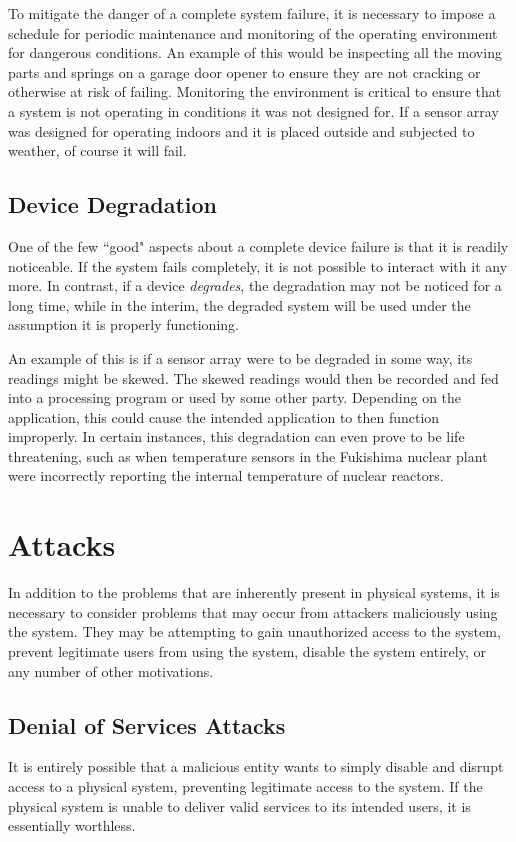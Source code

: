 To mitigate the danger of a complete system failure, it is necessary to impose a schedule for periodic maintenance and
monitoring of the operating environment for dangerous conditions. An example of this would be inspecting all the moving
parts and springs on a garage door opener to ensure they are not cracking or otherwise at risk of failing. 
Monitoring the environment is critical to ensure that a system is not operating in conditions it was not designed for. If a sensor
array was designed for operating indoors and it is placed outside and subjected to weather, of course it will fail.


\subsection{Device Degradation}
One of the few ``good" aspects about a complete device failure is that it is readily noticeable. If the system fails completely,
it is not possible to interact with it any more. In contrast, if a device \textit{degrades}, the degradation may not be noticed
for a long time, while in the interim, the degraded system will be used under the assumption it is properly functioning.

An example of this is if a sensor array were to be degraded in some way, its readings might be skewed. The skewed readings
would then be recorded and fed into a processing program or used by some other party. Depending on the application, this
could cause the intended application to then function improperly. In certain instances, this degradation can even prove to be
life threatening, such as when temperature sensors in the Fukishima nuclear plant were incorrectly reporting the internal
temperature of nuclear reactors.~\cite{fukushima}

\section{Attacks}
In addition to the problems that are inherently present in physical systems, it is necessary to consider problems that may
occur from attackers maliciously using the system. They may be attempting to gain unauthorized access to the system,
prevent legitimate users from using the system, disable the system entirely, or any number of other motivations.

\subsection{Denial of Services Attacks}
It is entirely possible that a malicious entity wants to simply disable and disrupt access to a physical system, preventing legitimate access
to the system. If the physical system is unable to deliver valid services to its intended users, it is essentially worthless. 

